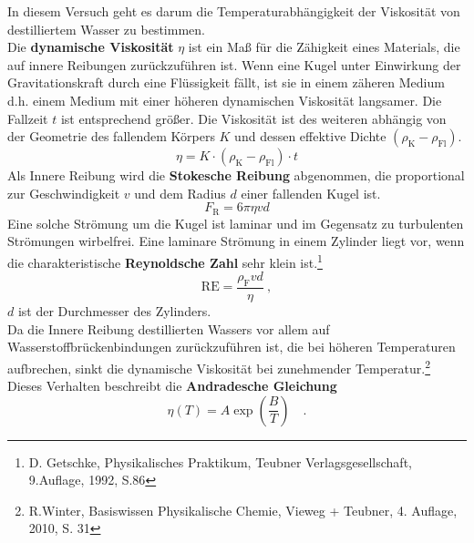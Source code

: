 In diesem Versuch geht es darum die Temperaturabhängigkeit der Viskosität von destilliertem Wasser zu bestimmen. \\
Die \textbf{dynamische Viskosität} $\eta$ ist ein Maß für die Zähigkeit eines Materials, die auf innere Reibungen zurückzuführen ist. Wenn eine Kugel unter Einwirkung der Gravitationskraft durch eine Flüssigkeit fällt, ist sie in einem zäheren Medium d.h. einem Medium mit einer höheren dynamischen Viskosität langsamer. Die Fallzeit $t$ ist entsprechend größer. Die Viskosität ist des weiteren abhängig von der Geometrie des fallendem Körpers $K$ und dessen effektive Dichte $ (\rho_\text{K}-\rho_\text{Fl}) $.
\begin{equation}
\label{Visk}
\eta = K \cdot (\rho_\text{K} - \rho_\text{Fl}) \cdot  t
\end{equation}
Als Innere Reibung wird die \textbf{Stokesche Reibung} abgenommen, die proportional zur Geschwindigkeit $v$ und dem Radius $d$ einer fallenden Kugel ist.
\begin{equation}
F_\text{R} = 6\pi \eta v d
\end{equation}
Eine solche Strömung um die Kugel ist laminar und im Gegensatz zu turbulenten Strömungen wirbelfrei. Eine laminare Strömung in einem Zylinder liegt vor, wenn die charakteristische \textbf{Reynoldsche Zahl} sehr klein ist.\footnote{D. Getschke, Physikalisches Praktikum, Teubner Verlagsgesellschaft, 9.Auflage, 1992, S.86}
\begin{equation}
\label{Reynolds}
\text{RE} = \frac{\rho_\text{F} v d}{\eta} \ ,
\end{equation}
$d$ ist der Durchmesser des Zylinders. \\
Da die Innere Reibung destillierten Wassers vor allem auf Wasserstoffbrückenbindungen zurückzuführen ist, die bei höheren Temperaturen aufbrechen, sinkt die dynamische Viskosität bei zunehmender Temperatur.\footnote{R.Winter, Basiswissen Physikalische Chemie, Vieweg + Teubner, 4. Auflage, 2010, S. 31} Dieses Verhalten beschreibt die \textbf{Andradesche Gleichung}
\begin{equation}
\label{Andra}
\eta(T) = A \exp \left(\frac{B}{T}\right) \quad.
\end{equation}
